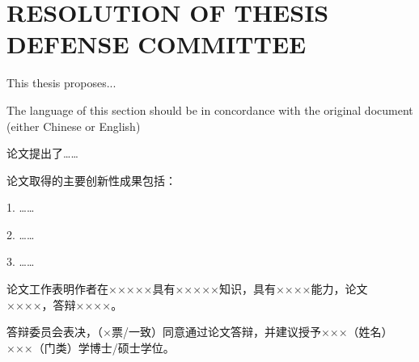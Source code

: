 
\chapter{RESOLUTION OF THESIS DEFENSE COMMITTEE}

This thesis proposes...

The language of this section should be in concordance with the original document (either Chinese or English)

论文提出了……

论文取得的主要创新性成果包括：

1. ……

2. ……

3. ……

论文工作表明作者在×××××具有×××××知识，具有××××能力，论文××××，答辩××××。

答辩委员会表决，（×票/一致）同意通过论文答辩，并建议授予×××（姓名）×××（门类）学博士/硕士学位。
